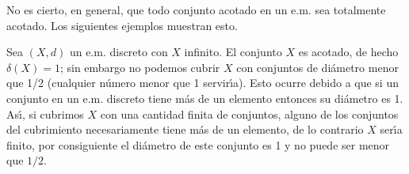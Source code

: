 No es cierto, en general, que todo conjunto acotado en un e.m. sea
totalmente acotado. Los siguientes ejemplos muestran esto.

\begin{ejemplo} Sea $(X,d)$ un e.m. discreto con $X$ infinito. El
conjunto $X$ es acotado, de hecho $\delta(X)=1$; sin embargo no
podemos cubrir $X$ con conjuntos de di\'ametro menor que 1/2
(cualquier n\'umero menor que 1 servir\'{\i}a). Esto ocurre debido
a que si un conjunto en un e.m. discreto tiene m\'as de un
elemento entonces su di\'ametro es 1. As\'{\i}, si cubrimos $X$
con una cantidad finita de conjuntos, alguno de los conjuntos del
cubrimiento necesariamente tiene m\'as de un elemento, de lo
contrario $X$ ser\'{\i}a finito, por consiguiente el di\'ametro de
este conjunto es 1 y no puede ser menor que $1/2$.
\end{ejemplo}

